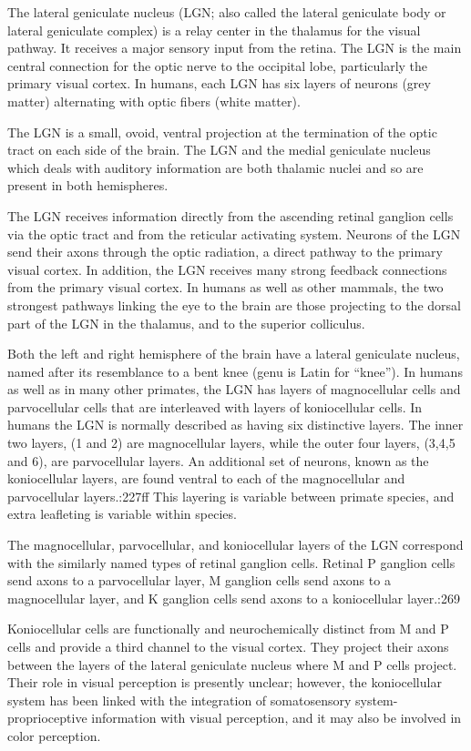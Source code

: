 The lateral geniculate nucleus (LGN; also called the lateral geniculate body or lateral geniculate complex) is a relay center in the thalamus for the visual pathway. It receives a major sensory input from the retina. The LGN is the main central connection for the optic nerve to the occipital lobe, particularly the primary visual cortex. In humans, each LGN has six layers of neurons (grey matter) alternating with optic fibers (white matter).

The LGN is a small, ovoid, ventral projection at the termination of the optic tract on each side of the brain. The LGN and the medial geniculate nucleus which deals with auditory information are both thalamic nuclei and so are present in both hemispheres.

The LGN receives information directly from the ascending retinal ganglion cells via the optic tract and from the reticular activating system. Neurons of the LGN send their axons through the optic radiation, a direct pathway to the primary visual cortex. In addition, the LGN receives many strong feedback connections from the primary visual cortex. In humans as well as other mammals, the two strongest pathways linking the eye to the brain are those projecting to the dorsal part of the LGN in the thalamus, and to the superior colliculus.

Both the left and right hemisphere of the brain have a lateral geniculate nucleus, named after its resemblance to a bent knee (genu is Latin for ``knee''). In humans as well as in many other primates, the LGN has layers of magnocellular cells and parvocellular cells that are interleaved with layers of koniocellular cells. In humans the LGN is normally described as having six distinctive layers. The inner two layers, (1 and 2) are magnocellular layers, while the outer four layers, (3,4,5 and 6), are parvocellular layers. An additional set of neurons, known as the koniocellular layers, are found ventral to each of the magnocellular and parvocellular layers.:227ff This layering is variable between primate species, and extra leafleting is variable within species.

The magnocellular, parvocellular, and koniocellular layers of the LGN correspond with the similarly named types of retinal ganglion cells. Retinal P ganglion cells send axons to a parvocellular layer, M ganglion cells send axons to a magnocellular layer, and K ganglion cells send axons to a koniocellular layer.:269

Koniocellular cells are functionally and neurochemically distinct from M and P cells and provide a third channel to the visual cortex. They project their axons between the layers of the lateral geniculate nucleus where M and P cells project. Their role in visual perception is presently unclear; however, the koniocellular system has been linked with the integration of somatosensory system-proprioceptive information with visual perception, and it may also be involved in color perception.

